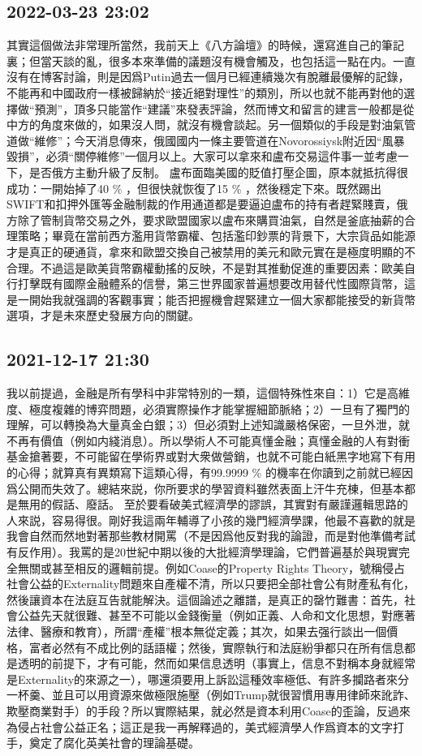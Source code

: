 \documentclass[twocolumn]{ctexart}
\begin{document}
\subsection*{2022-03-23 23:02}

其實這個做法非常理所當然，我前天上《八方論壇》的時候，還寫進自己的筆記裏；但當天談的亂，很多本來準備的議題沒有機會觸及，也包括這一點在内。一直沒有在博客討論，則是因爲Putin過去一個月已經連續幾次有脫離最優解的記錄，不能再和中國政府一樣被歸納於“接近絕對理性”的類別，所以也就不能再對他的選擇做“預測”，頂多只能當作“建議”來發表評論，然而博文和留言的建言一般都是從中方的角度來做的，如果沒人問，就沒有機會談起。另一個類似的手段是對油氣管道做“維修”；今天消息傳來，俄國國内一條主要管道在Novorossiysk附近因“風暴毀損”，必須“關停維修”一個月以上。大家可以拿來和盧布交易這件事一並考慮一下，是否俄方主動升級了反制。
盧布面臨美國的貶值打壓企圖，原本就抵抗得很成功：一開始掉了40 \% ，但很快就恢復了15 \% ，然後穩定下來。既然踢出SWIFT和扣押外匯等金融制裁的作用通道都是要逼迫盧布的持有者趕緊賤賣，俄方除了管制貨幣交易之外，要求歐盟國家以盧布來購買油氣，自然是釜底抽薪的合理策略；畢竟在當前西方濫用貨幣霸權、包括濫印鈔票的背景下，大宗貨品如能源才是真正的硬通貨，拿來和歐盟交換自己被禁用的美元和歐元實在是極度明顯的不合理。不過這是歐美貨幣霸權動搖的反映，不是對其推動促進的重要因素：歐美自行打擊既有國際金融體系的信譽，第三世界國家普遍想要改用替代性國際貨幣，這是一開始我就强調的客觀事實；能否把握機會趕緊建立一個大家都能接受的新貨幣選項，才是未來歷史發展方向的關鍵。
\subsection*{2021-12-17 21:30}

我以前提過，金融是所有學科中非常特別的一類，這個特殊性來自：1）它是高維度、極度複雜的博弈問題，必須實際操作才能掌握細節脈絡；2）一旦有了獨門的理解，可以轉換為大量真金白銀；3）但必須對上述知識嚴格保密，一旦外泄，就不再有價值（例如内綫消息）。所以學術人不可能真懂金融；真懂金融的人有對衝基金搶著要，不可能留在學術界或對大衆做營銷，也就不可能白紙黑字地寫下有用的心得；就算真有異類寫下這類心得，有99.9999 \% 的機率在你讀到之前就已經因爲公開而失效了。總結來説，你所要求的學習資料雖然表面上汗牛充棟，但基本都是無用的假話、廢話。
至於要看破美式經濟學的謬誤，其實對有嚴謹邏輯思路的人來説，容易得很。剛好我這兩年輔導了小孩的幾門經濟學課，他最不喜歡的就是我會自然而然地對著那些教材開罵（不是因爲他反對我的論證，而是對他準備考試有反作用）。我罵的是20世紀中期以後的大批經濟學理論，它們普遍基於與現實完全無關或甚至相反的邏輯前提。例如Coase的Property Rights Theory，號稱侵占社會公益的Externality問題來自產權不清，所以只要把全部社會公有財產私有化，然後讓資本在法庭互告就能解決。這個論述之離譜，是真正的罄竹難書：首先，社會公益先天就很難、甚至不可能以金錢衡量（例如正義、人命和文化思想，對應著法律、醫療和教育），所謂“產權”根本無從定義；其次，如果去强行談出一個價格，富者必然有不成比例的話語權；然後，實際執行和法庭紛爭都只在所有信息都是透明的前提下，才有可能，然而如果信息透明（事實上，信息不對稱本身就經常是Externality的來源之一），哪還須要用上訴訟這種效率極低、有許多攔路者來分一杯羹、並且可以用資源來做極限施壓（例如Trump就很習慣用專用律師來訛詐、欺壓商業對手）的手段？所以實際結果，就必然是資本利用Coase的歪論，反過來為侵占社會公益正名；這正是我一再解釋過的，美式經濟學人作爲資本的文字打手，奠定了腐化英美社會的理論基礎。
\end{document}
